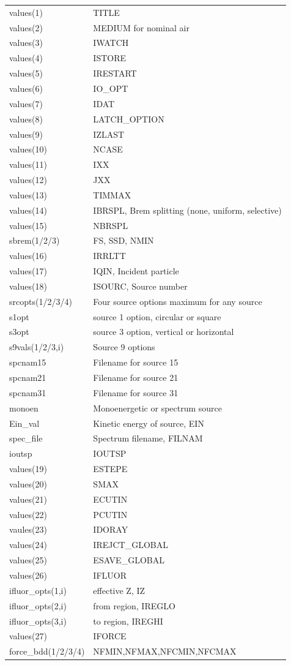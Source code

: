 \documentclass[12pt]{book}
\begin{document}
\begin{tabular}{|p{4.5cm}|p{11.5cm}|}\hline
values(1) & TITLE \\
values(2) & MEDIUM for nominal air \\
values(3) & IWATCH \\
values(4) & ISTORE \\
values(5) & IRESTART\\
values(6) & IO\_OPT\\
values(7) & IDAT\\
values(8) & LATCH\_OPTION\\
values(9) & IZLAST\\
values(10) & NCASE\\
values(11) & IXX\\
values(12) & JXX\\
values(13) & TIMMAX\\
values(14) & IBRSPL, Brem splitting (none, uniform, selective)\\
values(15) & NBRSPL\\
sbrem(1/2/3) & FS, SSD, NMIN\\
values(16) & IRRLTT\\
values(17) & IQIN, Incident particle\\
values(18) & ISOURC, Source number\\
srcopts(1/2/3/4) & Four source options maximum for any source\\
s1opt & source 1 option, circular or square \\
s3opt & source 3 option, vertical or horizontal \\
s9vals(1/2/3,i) & Source 9 options \\
spcnam15 & Filename for source 15\\
spcnam21 & Filename for source 21\\
spcnam31 & Filename for source 31\\
monoen  & Monoenergetic or spectrum source \\
Ein\_val & Kinetic energy of source, EIN\\
spec\_file & Spectrum filename, FILNAM \\
ioutsp & IOUTSP \\
values(19) & ESTEPE\\
values(20) & SMAX\\
values(21) & ECUTIN\\
values(22) & PCUTIN\\
vaules(23) & IDORAY\\
values(24) & IREJCT\_GLOBAL\\
values(25) & ESAVE\_GLOBAL\\
values(26) & IFLUOR\\
ifluor\_opts(1,i) & effective Z, IZ\\
ifluor\_opts(2,i) & from region, IREGLO\\
ifluor\_opts(3,i) & to region, IREGHI\\
values(27) & IFORCE\\
force\_bdd(1/2/3/4) & NFMIN,NFMAX,NFCMIN,NFCMAX\\
\hline\end{tabular}
\end{document}
